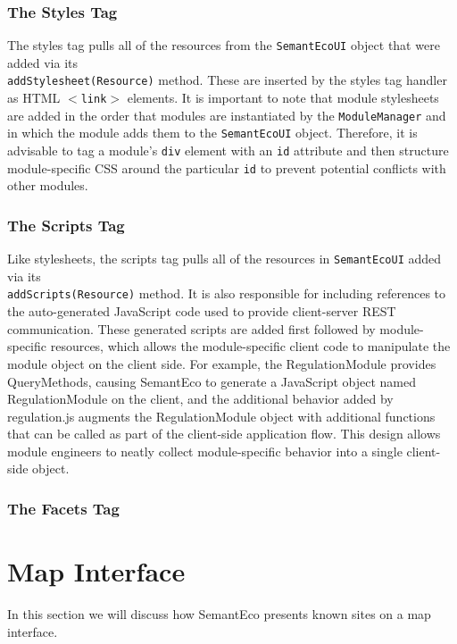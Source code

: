 \documentclass[letterpaper]{report}
\begin{document}
\subsubsection{The Styles Tag}
The styles tag pulls all of the resources from the \texttt{SemantEcoUI} object that were added via its \\\texttt{addStylesheet(Resource)} method. These are inserted by the styles tag handler as HTML \texttt{$<$link$>$} elements. It is important to note that module stylesheets are added in the order that modules are instantiated by the \texttt{ModuleManager} and in which the module adds them to the \texttt{SemantEcoUI} object. Therefore, it is advisable to tag a module's \texttt{div} element with an \texttt{id} attribute and then structure module-specific CSS around the particular \texttt{id} to prevent potential conflicts with other modules.

\subsubsection{The Scripts Tag}
Like stylesheets, the scripts tag pulls all of the resources in \texttt{SemantEcoUI} added via its \\\texttt{addScripts(Resource)} method. It is also responsible for including references to the auto-generated JavaScript code used to provide client-server REST communication. These generated scripts are added first followed by module-specific resources, which allows the module-specific client code to manipulate the module object on the client side. For example, the RegulationModule provides QueryMethods, causing SemantEco to generate a JavaScript object named RegulationModule on the client, and the additional behavior added by regulation.js augments the RegulationModule object with additional functions that can be called as part of the client-side application flow. This design allows module engineers to neatly collect module-specific behavior into a single client-side object.

\subsubsection{The Facets Tag}


\section{Map Interface}
\label{maps}
In this section we will discuss how SemantEco presents known sites on a map interface.
\end{document}
